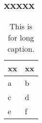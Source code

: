 \documentclass[UTF8,cs4size]{ctexart}
\begin{document}
\subsection{xxxxx}
\begin{table}
  \begin{small}    
    \caption{This is for long caption.}
    \label{tab:table}
    \begin{center}
      \begin{tabular}[c]{l|l}
        \hline
        \multicolumn{1}{c|}{\textbf{xx}} & 
        \multicolumn{1}{c}{\textbf{xx}} \\
        \hline
	      a & b \\
	      c & d \\
	      e & f \\
        \hline
      \end{tabular}
    \end{center}
  \end{small}
\end{table}

\clearpage



\newpage
\end{document}
